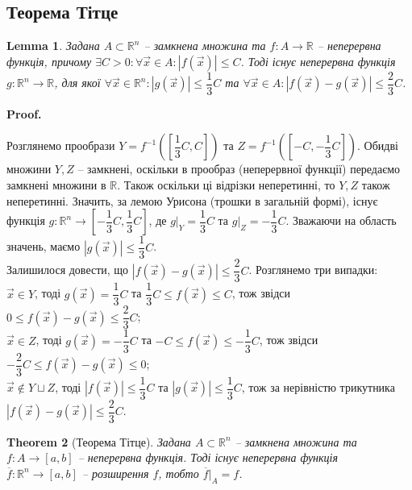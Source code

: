 \documentclass[a4paper, 10pt]{article}
\makeatletter
\def\qed{$\blacksquare$}
\theoremstyle{theoremdd}
\newtheorem{theorem}{Theorem}[subsection]
\theoremstyle{theoremdd}
\theoremstyle{theoremdd}
\theoremstyle{theoremdd}
\theoremstyle{theoremdd}
\theoremstyle{theoremdd}
\theoremstyle{theoremdd}
\theoremstyle{theoremdd}
\theoremstyle{theoremdd}
\theoremstyle{theoremdd}
\theoremstyle{theoremdd}
\theoremstyle{theoremdd}
\theoremstyle{theoremdd}
\newtheorem{lemma}[theorem]{Lemma}
\theoremstyle{theoremdd}
\theoremstyle{theoremdd}
\renewenvironment{proof}[1][Proof.\\]{\par
\pushQED{\hfill \qed}%
\normalfont \topsep6\p@\@plus6\p@\relax
\trivlist
\item\relax
{\bfseries
#1\@addpunct{.}}\hspace\labelsep\ignorespaces
}{%
\popQED\endtrivlist\@endpefalse
}
\makeatother
\begin{document}
\subsection{Теорема Тітце}
\begin{lemma}
Задана $A \subset \mathbb{R}^n$ -- замкнена множина та $f \colon A \to \mathbb{R}$ -- неперервна функція, причому $\exists C > 0: \forall \vec{x} \in A: |f(\vec{x})| \leq C$. Тоді існує неперервна функція $g \colon \mathbb{R}^n \to \mathbb{R}$, для якої $\forall \vec{x} \in \mathbb{R}^n: |g(\vec{x})| \leq \dfrac{1}{3}C$ та $\forall \vec{x} \in A: |f(\vec{x}) - g(\vec{x})| \leq \dfrac{2}{3}C$.
\end{lemma}

\begin{proof}
Розглянемо прообрази $Y = f^{-1}\left(\left[\dfrac{1}{3}C,C\right]\right)$ та $Z = f^{-1}\left(\left[-C, -\dfrac{1}{3}C \right]\right)$. Обидві множини $Y,Z$ -- замкнені, оскільки в прообраз (неперервної функції) передаємо замкнені множини в $\mathbb{R}$. Також оскільки ці відрізки неперетинні, то $Y,Z$ також неперетинні. Значить, за лемою Урисона (трошки в загальній формі), існує функція $g \colon \mathbb{R}^n \to \left[-\dfrac{1}{3}C, \dfrac{1}{3}C\right]$, де $g|_Y = \dfrac{1}{3}C$ та $g|_Z = -\dfrac{1}{3}C$. Зважаючи на область значень, маємо $|g(\vec{x})| \leq \dfrac{1}{3}C$. \\
Залишилося довести, що $|f(\vec{x}) - g(\vec{x})| \leq \dfrac{2}{3}C$. Розглянемо три випадки:\\
$\vec{x} \in Y$, тоді $g(\vec{x}) = \dfrac{1}{3}C$ та $\dfrac{1}{3}C \leq f(\vec{x}) \leq C$, тож звідси $0 \leq f(\vec{x}) - g(\vec{x}) \leq \dfrac{2}{3}C$;\\
$\vec{x} \in Z$, тоді $g(\vec{x}) = -\dfrac{1}{3}C$ та $-C \leq f(\vec{x}) \leq -\dfrac{1}{3}C$, тож звідси $-\dfrac{2}{3}C \leq f(\vec{x}) - g(\vec{x}) \leq 0$;\\
$\vec{x} \notin Y \sqcup Z$, тоді $|f(\vec{x})| \leq \dfrac{1}{3}C$ та $|g(\vec{x})| \leq \dfrac{1}{3}C$, тож за нерівністю трикутника $|f(\vec{x}) - g(\vec{x})| \leq \dfrac{2}{3}C$.
\end{proof}

\begin{theorem}[Теорема Тітце]
Задана $A \subset \mathbb{R}^n$ -- замкнена множина та $f \colon A \to [a,b]$ -- неперервна функція. Тоді існує неперервна функція $\overline{f} \colon \mathbb{R}^n \to [a,b]$ -- розширення $f$, тобто $\overline{f}|_{A} = f$.
\end{theorem}
\end{document}
